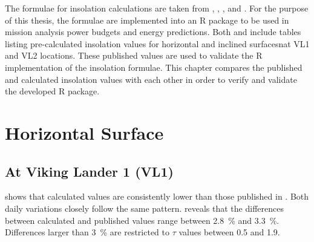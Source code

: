 The formulae for insolation calculations are taken from , , , and . For the purpose of this thesis, the formulae are implemented into an R package to be used in mission analysis power budgets and energy predictions. Both  and  include tables listing pre-calculated insolation values for horizontal and inclined surfacesnat \ac{VL1} and \ac{VL2} locations. These published values are used to validate the R implementation of the insolation formulae. This chapter compares the published and calculated insolation values with each other in order to verify and validate the developed R package.


\section{Horizontal Surface}
\subsection{At Viking Lander 1 (VL1)}
 shows that calculated values are consistently lower than those published in . Both daily variations closely follow the same pattern.  reveals that the differences between calculated and published values range between \SI{2.8}{\percent} and \SI{3.3}{\percent}. Differences larger than \SI{3}{\percent} are restricted to $\tau$ values between 0.5 and 1.9.

